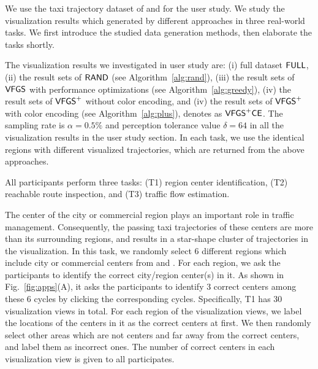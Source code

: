 We use the taxi trajectory dataset of \pt{} and \sz{} for the user study.
We study the visualization results which generated by different approaches in three real-world tasks.
We first introduce the studied data generation methods, then elaborate the tasks shortly.

The visualization results we investigated in user study are: (i) full dataset $\mathsf{FULL}$,
(ii) the result sets of $\mathsf{RAND}$ (see Algorithm~\ref{alg:rand}),
(iii) the result sets of $\mathsf{VFGS}$ with performance optimizations (see Algorithm~\ref{alg:greedy}),
(iv) the result sets of $\mathsf{VFGS}^{+}$ without color encoding,
and (iv) the result sets of $\mathsf{VFGS}^{+}$ with color encoding (see Algorithm~\ref{alg:plus}), denotes as $\mathsf{VFGS}^{+}\mathsf{CE}$.
The sampling rate is $\alpha = 0.5\%$ and perception tolerance value $\delta = 64$ in all the visualization results in the user study section.
In each task, we use the identical regions with different visualized trajectories, which are returned from the above approaches.


All participants perform three tasks:  (T1) region center identification, (T2) reachable route inspection, and (T3) traffic flow estimation.

The center of the city or commercial region plays an important role in traffic management.
Consequently, the passing taxi trajectories of these centers are more than its surrounding regions, and results in a star-shape cluster of trajectories in the visualization.
In this task, we randomly select 6 different regions which include city or commercial centers from \pt{} and \sz{}.
For each region, we ask the participants to identify the correct city/region center(s) in it.
As shown in Fig.~\ref{fig:apps}(A), it asks the participants to identify 3 correct centers among these 6 cycles by clicking the corresponding cycles.
Specifically, T1 has 30 visualization views in total.
For each region of the visualization views,  we label the locations of the centers in it as the correct centers at first.
We then randomly select other areas which are not centers and far away from the correct centers, and label them as incorrect ones.
The number of correct centers in each visualization view is given to all participates.




